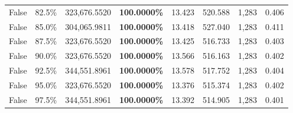 \begin{table}[H]
\begin{tabular}{lllrllll}
\cline{1-8}
False & 82.5\% & 323,676.5520 & \bfseries \color{red} 100.0000\% & 13.423 & 520.588 & 1,283 & 0.406 \\
\cline{1-8}
False & 85.0\% & \color{red} 304,065.9811 & \bfseries \color{red} 100.0000\% & 13.418 & 527.040 & 1,283 & 0.411 \\
\cline{1-8}
False & 87.5\% & 323,676.5520 & \bfseries \color{red} 100.0000\% & 13.425 & 516.733 & 1,283 & 0.403 \\
\cline{1-8}
False & 90.0\% & 323,676.5520 & \bfseries \color{red} 100.0000\% & 13.566 & 516.163 & 1,283 & 0.402 \\
\cline{1-8}
False & 92.5\% & 344,551.8961 & \bfseries \color{red} 100.0000\% & 13.578 & 517.752 & 1,283 & 0.404 \\
\cline{1-8}
False & 95.0\% & 323,676.5520 & \bfseries \color{red} 100.0000\% & 13.376 & 515.374 & 1,283 & 0.402 \\
\cline{1-8}
False & 97.5\% & 344,551.8961 & \bfseries \color{red} 100.0000\% & 13.392 & 514.905 & 1,283 & 0.401 \\
\cline{1-8}
\bottomrule
\end{tabular}
\end{table}
